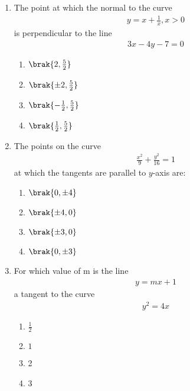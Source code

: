 \begin{enumerate}
        \item The point at which the normal to the curve 
\begin{align}
    y = x+\frac{1}{x}, x>0 
\end{align}
 is perpendicular to the line
 \begin{align}
     3x-4y-7 = 0 
 \end{align}
\begin{enumerate}
    \item $\brak{2,\frac{5}{2}}$   \item $\brak{\pm2,\frac{5}{2}}$  

         \item $\brak{-\frac{1}{2},\frac{5}{2}}$    \item $\brak{\frac{1}{2},\frac{5}{2}}$
\end{enumerate}
         
         \item The points on the curve
         \begin{align}
             \frac{x^2}{9} +\frac{y^2}{16} = 1
         \end{align}
         at which the tangents are parallel to $y$-axis are:
         \begin{enumerate}
             \item $\brak{0,\pm4}$   \item $\brak{\pm4,0}$  

         \item  $\brak{\pm3,0}$   \item $\brak{0,\pm3}$
         \end{enumerate}
           
         \item For which value of m is the line
         \begin{align}
            y = mx + 1 
         \end{align}a tangent to the curve 
        \begin{align}
            y^2 = 4x 
        \end{align}
        \begin{enumerate}
            \item  $\frac{1}{2}$  \item $1$

         \item 2  \item 3
        \end{enumerate}
\end{enumerate}
